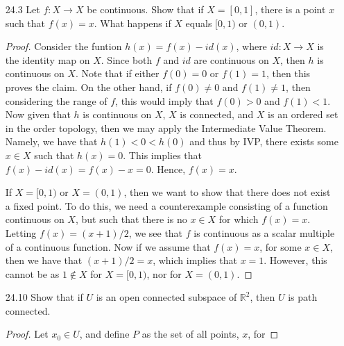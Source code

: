 \documentclass[12pt]{article}
\theoremstyle{definition}
\begin{document}
\begin{enumerate}
        \item[24.3] Let $f:X\to X$ be continuous. Show that if $X=[0, 1]$, there is
            a point $x$ such that $f(x)=x$. What happens if $X$ equals $[0, 1)$
            or $(0, 1)$.
            \begin{proof}
                Consider the funtion $h(x)=f(x)-id(x)$, where $id:X\to X$ is
                the identity map on $X$. Since both $f$ and $id$ are continuous
                on $X$, then $h$ is continuous on $X$. Note that if either
                $f(0)=0$ or $f(1)=1$, then this proves the claim. On the other
                hand, if $f(0)$ and $f(1)$, then considering the
                range of $f$, this would imply that $f(0)>0$ and $f(1)<1$. Now
                given that $h$ is continuous on $X$, $X$ is connected, and $X$ is an ordered set in the
                order topology, then we may apply the Intermediate Value
                Theorem. Namely, we have that $h(1)<0<h(0)$ and thus by IVP,
                there exists some $x\in X$ such that $h(x)=0$. This implies
                that $f(x)-id(x)=f(x)-x=0$. Hence, $f(x)=x$.\par\hspace{4mm} If
                $X=[0, 1)$ or $X=(0, 1)$, then we want to show that there does not exist
                a fixed point. To do this, we need a counterexample consisting
                of a function continuous on $X$, but such that there is no
                $x\in X$ for which $f(x)=x$. Letting $f(x)=(x+1)/2$, we see
                that $f$ is continuous as a scalar multiple of a continuous
                function. Now if we assume that $f(x)=x$, for some $x\in X$,
                then we have that $(x+1)/2=x$, which implies that $x=1$.
                However, this cannot be as $1\not\in X$ for $X=[0, 1)$, nor for
                $X=(0, 1)$.
            \end{proof}
        \item[24.10] Show that if $U$ is an open connected subspace of
            $^2$, then $U$ is path connected.
            \begin{proof}
                Let $x_0\in U$, and define $P$ as the set of all points, $x$, for

\end{proof}
\end{enumerate}
\end{document}
